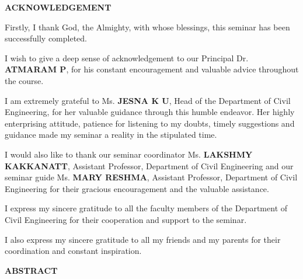 \documentclass[12pt,a4paper,final]{report}
\newcommand{\frontheading}[1]{%
  \vspace*{4.1pt}%
  \begin{center}{\bfseries\fontsize{16}{16}\selectfont #1}\end{center}%
  \vspace{0.6pt}}
\begin{document}
\sloppy



\newpage
{}
\setcounter{page}{1}
\begingroup\setlength{\parskip}{13pt}
\frontheading{ACKNOWLEDGEMENT}

Firstly, I thank God, the Almighty, with whose blessings, this seminar has been
successfully completed.

I wish to give a deep sense of acknowledgement to our Principal Dr. \textbf{ATMARAM P}, for his
constant encouragement and valuable advice throughout the course.

I am extremely grateful to Ms. \textbf{JESNA K U}, Head of the Department of Civil Engineering,
for her valuable guidance through this humble endeavor. Her highly enterprising attitude,
patience for listening to my doubts, timely suggestions and guidance made my seminar a
reality in the stipulated time.

I would also like to thank our seminar coordinator Ms. \textbf{LAKSHMY KAKKANATT}, Assistant
Professor, Department of Civil Engineering and our seminar guide Ms. \textbf{MARY RESHMA},
Assistant Professor, Department of Civil Engineering for their gracious encouragement and
the valuable assistance.

I express my sincere gratitude to all the faculty members of the Department of Civil
Engineering for their cooperation and support to the seminar.

I also express my sincere gratitude to all my friends and my parents for their coordination
and constant inspiration.

\endgroup
\newpage
\begingroup\setlength{\parskip}{13pt}
\frontheading{ABSTRACT}
\end{document}
